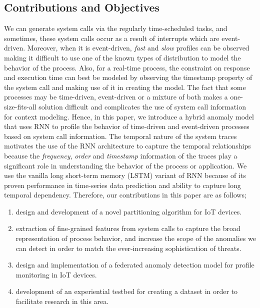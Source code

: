 \subsection{Contributions and Objectives}
\label{subsec:time-event}
We can generate system calls via the regularly time-scheduled tasks, and 
sometimes, these system calls 
occur as a result of interrupts which are event-driven. Moreover, when it is 
event-driven, \emph{fast} and \emph{slow} 
profiles can be observed making it difficult to use one of the known types of 
distribution to model the behavior of the process. Also, for a real-time 
process, the constraint on response and execution time can best be modeled by 
observing the timestamp property of the system call and making use of it in 
creating the model. The fact that some processes may be time-driven, 
event-driven or 
a mixture of both makes a one-size-fits-all solution difficult and complicates 
the use of system call information for context modeling. Hence, in this 
paper, we introduce a hybrid anomaly model that uses RNN to profile the 
behavior of time-driven and event-driven processes based on system call 
information. The temporal nature of the system traces motivates the use of the 
RNN architecture to capture the temporal relationships because the 
\emph{frequency}, 
\emph{order} and \emph{timestamp} information of the traces play a significant 
role in understanding the behavior of the process or application. We use the 
vanilla long short-term memory (LSTM) 
\cite{hochreiter1997long} variant of RNN because of its proven performance in 
time-series data prediction \cite{malhotra2015long} and ability to capture long 
temporal dependency. Therefore, our contributions in this paper are as follows;
\begin{enumerate}[label={\alph*)},font={\bfseries}]
    \item design and development of a novel partitioning algorithm for IoT 
    devices.
\item extraction of fine-grained features from system calls to capture the 
broad representation of process behavior, and increase the scope of the 
anomalies we can detect in order to match the ever-increasing sophistication of 
threats. 
\item design and implementation of a federated anomaly detection model for 
profile monitoring in IoT devices.
\item development of an experiential testbed for creating a dataset in order to 
facilitate research in this area.
\end{enumerate}
